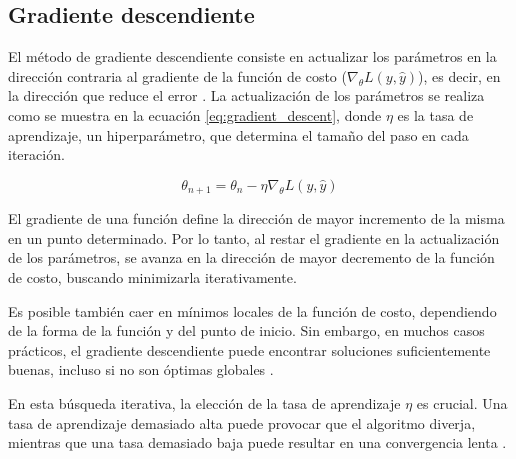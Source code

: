 \subsection{Gradiente descendiente}
\label{sec:gradiente_descendiente}

El método de gradiente descendiente consiste en actualizar los parámetros en la dirección contraria al gradiente de la función de costo ($\nabla_{\theta} L(y, \hat{y})$), es decir, en la dirección que reduce el error \cite{Cauchy1847}. La actualización de los parámetros se realiza como se muestra en la ecuación \ref{eq:gradient_descent}, donde $\eta$ es la tasa de aprendizaje, un hiperparámetro, que determina el tamaño del paso en cada iteración.

\begin{equation}
    \label{eq:gradient_descent}
    \theta_{n+1} = \theta_n - \eta \nabla_{\theta} L(y, \hat{y})
\end{equation}

El gradiente de una función define la dirección de mayor incremento de la misma en un punto determinado. Por lo tanto, al restar el gradiente en la actualización de los parámetros, se avanza en la dirección de mayor decremento de la función de costo, buscando minimizarla iterativamente.

Es posible también caer en mínimos locales de la función de costo, dependiendo de la forma de la función y del punto de inicio. Sin embargo, en muchos casos prácticos, el gradiente descendiente puede encontrar soluciones suficientemente buenas, incluso si no son óptimas globales \cite{Bishop2006}.

En esta búsqueda iterativa, la elección de la tasa de aprendizaje $\eta$ es crucial. Una tasa de aprendizaje demasiado alta puede provocar que el algoritmo diverja, mientras que una tasa demasiado baja puede resultar en una convergencia lenta \cite{Bishop2006}.
